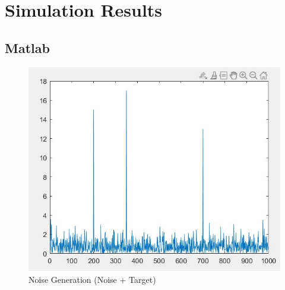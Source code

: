 \documentclass[10pt]{report}
\begin{document}
 \chapter {Simulation Results}
\section{Matlab}


 \begin{figure}[h]
	\centering
	\includegraphics[scale=1]{sim.jpg}
	\caption{Noise Generation (Noise + Target)}
\end{figure}

\newpage
\end{document}
